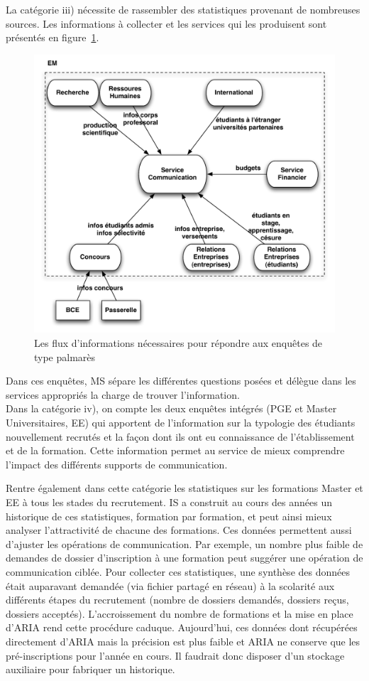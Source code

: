 \documentclass{book}
\begin{document}
La catégorie iii) nécessite de rassembler des statistiques provenant de 
nombreuses sources. Les informations à collecter et les services qui les 
produisent sont présentés en figure~\ref{fg:comm_flux}.
\begin{figure}[hbt]
\begin{center}
\includegraphics[width=.75\linewidth]{figs/comm_flux.pdf}
\end{center}
\caption{Les flux d'informations nécessaires pour répondre aux enquêtes de type palmarès}
\label{fg:comm_flux}
\end{figure}
Dans ces enquêtes, MS sépare les différentes questions posées et délègue
dans les services appropriés la charge de trouver l'information.\\


Dans la catégorie iv), on compte les deux enquêtes intégrés (PGE et Master 
Universitaires, EE) qui apportent de l'information sur la typologie des 
étudiants nouvellement recrutés et la façon dont ils ont eu connaissance
de l'établissement et de la formation. Cette information permet au service
de mieux comprendre l'impact des différents supports de communication.

Rentre également dans cette catégorie les statistiques sur les formations
Master et EE à tous les stades du recrutement. IS a construit au cours 
des années un historique de ces statistiques, formation par formation,
et peut ainsi mieux analyser l'attractivité de chacune des formations.
Ces données permettent aussi d'ajuster les opérations de communication.
Par exemple, un nombre plus faible de demandes de dossier d'inscription 
à une formation peut suggérer une opération de communication ciblée.
Pour collecter ces statistiques, une synthèse des données était auparavant
demandée (via fichier partagé en réseau) à la scolarité aux différents 
étapes du recrutement (nombre de dossiers demandés, dossiers reçus, 
dossiers acceptés). 
L'accroissement du nombre de formations et la mise en place d'ARIA rend 
cette procédure caduque. Aujourd'hui, ces données dont récupérées
directement d'ARIA mais la précision est plus faible et ARIA ne 
conserve que les pré-inscriptions pour l'année en cours. Il faudrait
donc disposer d'un stockage auxiliaire pour fabriquer un historique.
\end{document}
